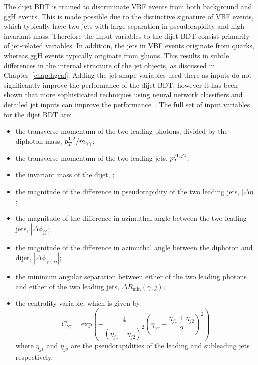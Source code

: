 The dijet BDT is trained to discriminate VBF events from both background and ggH events.
This is made possible due to the distinctive signature of VBF events, 
which typically have two jets with large separation in pseudorapidity and high invariant mass.
Therefore the input variables to the dijet BDT consist primarily of jet-related variables.
In addition, the jets in VBF events originate from quarks, 
whereas ggH events typically originate from gluons.
This results in subtle differences in the internal structure of the jet objects, 
as discussed in Chapter~\ref{chap:hgcal}.
Adding the jet shape variables used there as inputs 
do not significantly improve the performance of the dijet BDT;
however it has been shown that more sophisticated techniques using neural network classifiers
and detailed jet inputs can improve the performance~\cite{JackThesis}.
The full set of input variables for the dijet BDT are:
\begin{itemize}
\item the transverse momentum of the two leading photons, divided by the diphoton mass, $p_T^{1,2}/m_{\gamma\gamma}$;
\item the transverse momentum of the two leading jets, $p_T^{j1,j2}$;
\item the invariant mass of the dijet, \mjj;
\item the magnitude of the difference in pseudorapidity of the two leading jets, $|\Delta\eta|$;
\item the magnitude of the difference in azimuthal angle 
      between the two leading jets, $|\Delta\phi_{jj}|$;
\item the magnitude of the difference in azimuthal angle 
      between the diphoton and dijet, $|\Delta\phi_{\gamma\gamma,jj}|$;
\item the minimum angular separation between either of the two leading photons 
      and either of the two leading jets, $\Delta R_{\textrm{min}}(\gamma,j)$;
\item the centrality variable, which is given by:
\begin{equation}
C_{\gamma\gamma} = \mathrm{exp}\left(-\frac{4}{(\eta_{j1} - \eta_{j2})^{2}}\left( \eta_{\gamma\gamma} - \frac{\eta_{j1} + \eta_{j2}}{2} \right)^{2}\right)
\end{equation}
where $\eta_{j1}$ and $\eta_{j2}$ are the pseudorapidities of the 
leading and subleading jets respectively.
\end{itemize}

